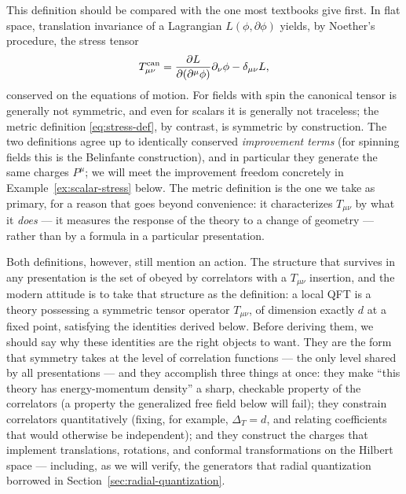 This definition should be compared with the one most textbooks give first.
In flat space, translation invariance of a Lagrangian $L(\phi,
\partial\phi)$ yields, by Noether's procedure, the  stress
tensor
\begin{equation}
T^{\rm can}_{\mu\nu} =
\frac{\partial L}{\partial(\partial^\mu \phi)}\partial_\nu \phi
- \delta_{\mu\nu} L ,
\label{eq:canonical-def}
\end{equation}
conserved on the equations of motion. For fields with spin the canonical
tensor is generally not symmetric, and even for scalars it is generally not
traceless; the metric definition \eqref{eq:stress-def}, by contrast, is
symmetric by construction. The two definitions agree up to identically
conserved \emph{improvement terms} (for spinning fields this is the
Belinfante construction), and in particular they generate the same charges
$P^\mu$; we will meet the improvement freedom concretely in
Example~\ref{ex:scalar-stress} below. The metric definition is the one we
take as primary, for a reason that goes beyond convenience: it
characterizes $T_{\mu\nu}$ by what it \emph{does} --- it measures the
response of the theory to a change of geometry --- rather than by a formula
in a particular presentation.

Both definitions, however, still mention an action. The structure that
survives in any presentation is the set of  obeyed by
correlators with a $T_{\mu\nu}$ insertion, and the modern attitude is to
take that structure as the definition: a local QFT is a theory possessing a
symmetric tensor operator $T_{\mu\nu}$, of dimension exactly $d$ at a fixed
point, satisfying the identities derived below. Before deriving them, we
should say why these identities are the right objects to want. They are the form that symmetry
takes at the level of correlation functions --- the only level shared by all
presentations --- and they accomplish three things at once: they make
``this theory has energy-momentum density'' a sharp, checkable property of
the correlators (a property the generalized free field below will fail);
they constrain correlators quantitatively (fixing, for example, $\Delta_T =
d$, and relating coefficients that would otherwise be independent); and they
construct the charges that implement translations, rotations, and conformal
transformations on the Hilbert space --- including, as we will verify, the
generators that radial quantization borrowed in
Section~\ref{sec:radial-quantization}.

